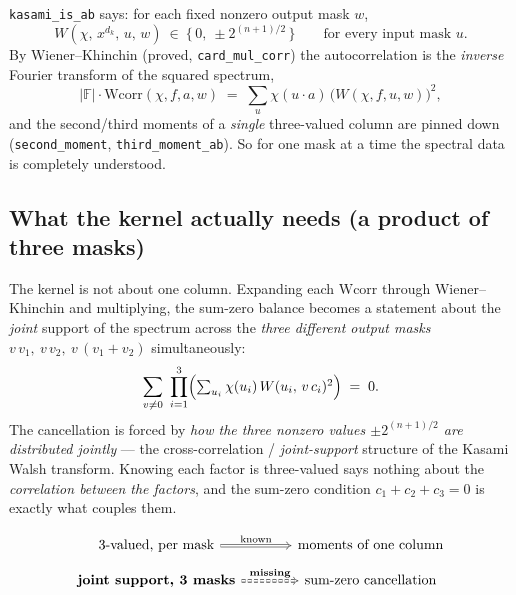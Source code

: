 \documentclass[11pt]{article}
\begin{document}
\noindent
\texttt{kasami\_is\_ab} says: for each fixed nonzero output mask $w$,
\[
  W(\chi,\,x^{d_k},\,u,\,w)\ \in\ \bigl\{\,0,\ \pm 2^{(n+1)/2}\,\bigr\}
  \qquad\text{for every input mask }u .
\]
By Wiener--Khinchin (proved, \texttt{card\_mul\_corr}) the autocorrelation is the
\emph{inverse} Fourier transform of the squared spectrum,
\[
  |\mathbb{F}|\cdot\mathrm{Wcorr}(\chi,f,a,w)
  \;=\;
  \sum_{u} \chi(u\cdot a)\,\bigl(W(\chi,f,u,w)\bigr)^2 ,
\]
and the second/third moments of a \emph{single} three-valued column are pinned
down (\texttt{second\_moment}, \texttt{third\_moment\_ab}).  So for one mask at
a time the spectral data is completely understood.

\subsection*{What the kernel actually needs (a product of three masks)}

\noindent
The kernel is not about one column.  Expanding each $\mathrm{Wcorr}$ through
Wiener--Khinchin and multiplying, the sum-zero balance becomes a statement about
the \emph{joint} support of the spectrum across the \emph{three different output
masks} $v\,v_1,\ v\,v_2,\ v\,(v_1{+}v_2)$ simultaneously:
\[
  \sum_{v\neq 0}\ \prod_{i=1}^{3}
     \Bigl(\textstyle\sum_{u_i}\chi(u_i)\,W(u_i,\,v\,c_i)^2\Bigr)
  \;=\;0 .
\]
The cancellation is forced by \emph{how the three nonzero values $\pm
2^{(n+1)/2}$ are distributed jointly} --- the cross-correlation /
\emph{joint-support} structure of the Kasami Walsh transform.  Knowing each
factor is three-valued says nothing about the \emph{correlation between the
factors}, and the sum-zero condition $c_1+c_2+c_3=0$ is exactly what couples
them.

\[
\begin{tikzcd}[row sep=small, column sep=large]
\text{3-valued, per mask} \arrow[r, Rightarrow, "\text{known}"]
   & \text{moments of one column} \\
\text{\textbf{joint support, 3 masks}} \arrow[r, Rightarrow, dashed, "\text{\textbf{missing}}"]
   & \text{sum-zero cancellation}
\end{tikzcd}
\]


\bigskip
\end{document}
